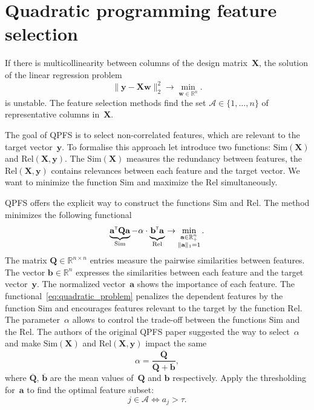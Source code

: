 \documentclass[a4paper,12pt]{article}
\theoremstyle{plain} %
\theoremstyle{definition} %
\theoremstyle{remark} %
\newcommand{\ba}{\mathbf{a}}
\newcommand{\bb}{\mathbf{b}}
\newcommand{\bw}{\mathbf{w}}
\newcommand{\by}{\mathbf{y}}
\newcommand{\cA}{\mathcal{A}}
\newcommand{\bQ}{\mathbf{Q}}
\newcommand{\bbR}{\mathbb{R}}
\newcommand{\bX}{\mathbf{X}}
\newcommand{\T}{{\text{\tiny\sffamily\upshape\mdseries T}}}
\begin{document}
	\section*{Quadratic programming feature selection}
If there is multicollinearity between columns of the design matrix~$\bX$, the solution of the linear regression problem
\begin{equation}
\| \by - \bX \bw\|_2^2 \rightarrow\min_{\bw \in \bbR^{n}}.
\label{eq:linear_regression}
\end{equation}
is unstable. 
The feature selection methods find the set $\cA \in \{1, \dots, n\}$ of representative columns in~$\bX$. 

The goal of QPFS is to select non-correlated features, which are relevant to the target vector~$\by$.
To formalise this approach let introduce two functions: $\text{Sim}(\bX)$ and $\text{Rel}(\bX, \by)$. 
The $\text{Sim}(\bX)$ measures the redundancy between features, the $\text{Rel}(\bX, \by)$ contains relevances between each feature and the target vector. 
We want to minimize the function Sim and maximize the Rel simultaneously.

QPFS offers the explicit way to construct the functions Sim and Rel. 
The method minimizes the following functional
\begin{equation}
\underbrace{\ba^{\T} \bQ \ba}_{\text{Sim}} - \alpha \cdot \underbrace{\vphantom{()} \mathbf{b}^{\T} \ba}_{\text{Rel}} \rightarrow \min_{\substack{\ba \in \bbR^n_+ \\ \|\ba\|_1=1}}.
\label{eq:quadratic_problem}
\end{equation}
The matrix $\bQ \in \bbR^{n \times n}$ entries measure the pairwise similarities between features. 
The vector $\mathbf{b} \in \bbR^n$ expresses the similarities between each feature and the target vector~$\by$.
The normalized vector~$\ba$ shows the importance of each feature. 
The functional~\eqref{eq:quadratic_problem} penalizes the dependent features by the function Sim and encourages features relevant to the target by the function Rel. 
The parameter~$\alpha$ allows to control the trade-off between the functions Sim and the Rel.
The authors of the original QPFS paper suggested the way to select~$\alpha$ and make $\text{Sim}(\bX)$ and $\text{Rel}(\bX, \by)$ impact the same
\begin{equation*}
\alpha = \frac{\overline{\bQ}}{\overline{\bQ} + \overline{\bb}},
\end{equation*}
where $\overline{\bQ}$, $\overline{\bb}$ are the mean values of~$\bQ$ and $\bb$ respectively.
Apply the thresholding for~$\ba$ to find the optimal feature subset:
\[
j \in \mathcal{A} \Leftrightarrow a_j > \tau.
\]
\end{document}
